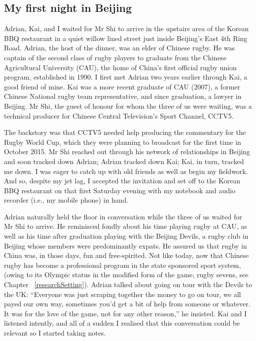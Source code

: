                                           \begin{CJK}{UTF8}{gbsn}

\section{My first night in Beijing \label{sect:adrian}}

Adrian, Kai, and I waited for Mr Shi to arrive in the upstairs area of the Korean BBQ restaurant in a quiet willow lined street just inside Beijing's East 4th Ring Road.  Adrian, the host of the dinner, was an elder of Chinese rugby.  He was captain of the second class of rugby players to graduate from the Chinese Agricultural University (CAU), the home of China's first official rugby union program, established in 1990.  I first met Adrian two years earlier through Kai, a good friend of mine.  Kai was a more recent graduate of CAU (2007), a former Chinese National rugby team representative, and since graduation, a lawyer in Beijing.  Mr Shi, the guest of honour for whom the three of us were waiting, was a technical producer for Chinese Central Television's Sport Channel, CCTV5.

The backstory was that CCTV5 needed help producing the commentary for the Rugby World Cup, which they were planning to broadcast for the first time in October 2015.  Mr Shi reached out through his network of relationships in Beijing and soon tracked down Adrian; Adrian tracked down Kai; Kai, in turn, tracked me down.  I was eager to catch up with old friends as well as begin my fieldwork. And so, despite my jet lag, I accepted the invitation and set off to the Korean BBQ restaurant on that first Saturday evening with my notebook and audio recorder (i.e., my mobile phone) in hand.

Adrian naturally held the floor in conversation while the three of us waited for Mr Shi to arrive.  He reminisced fondly about his time playing rugby at CAU, as well as his time after graduation playing with the Beijing Devils, a rugby club in Beijing whose members were predominantly expats.  He assured us that rugby in China was, in those days, fun and free-spirited.  Not like today, now that Chinese rugby has become a professional program in the state sponsored sport system, (owing to its Olympic status in the modified form of the game, rugby sevens, see Chapter ~\ref{researchSetting}).  Adrian talked about going on tour with the Devils to the UK:  ``Everyone was just scraping together the money to go on tour, we all payed our own way, sometimes you'd get a bit of help from someone or whatever. It was for the love of the game, not for any other reason,'' he insisted.  Kai and I listened intently, and all of a sudden I realised that this conversation could be relevant so I started taking notes.


\end{CJK}

